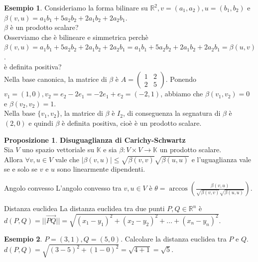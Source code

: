 \documentclass[a4paper]{article}
\theoremstyle{definition}
\newtheorem*{es}{Esempio}
\newtheorem*{prop}{Proposizione}
\begin{document}
	\begin{es}
		Consideriamo la forma bilinare su $\mathbb{R}^2, v = (a_1, a_2), u = (b_1, b_2)$ e $\beta(v, u) = a_1b_1 + 5a_2b_2 + 2a_1b_2 + 2a_2b_1$. \\
		$\beta$ è un prodotto scalare? \\
		Osserviamo che è bilineare e simmetrica perchè $\beta(v, u) = a_1b_1 + 5a_2b_2 + 2a_1b_2 + 2a_2b_1 = a_1b_1 + 5a_2b_2 + 2a_1b_2 + 2a_2b_1 = \beta(u, v)$. \\
		è definita positiva? \\
		Nella base canonica, la matrice di $\beta$ è $A = \begin{pmatrix}
			1 & 2 \\
			2 & 5
		\end{pmatrix}$. Ponendo $v_1 = (1, 0), v_2 = e_2 - 2e_1 = -2e_1 + e_2 = (-2, 1)$, abbiamo che $\beta(v_1, v_2) = 0$ e $\beta(v_2, v_2) = 1$. \\
		Nella base $\{v_1, v_2\}$, la matrice di $\beta$ è $I_2$, di conseguenza la segnatura di $\beta$ è $(2, 0)$ e quindi $\beta$ è definita positiva, cioè è un prodotto scalare.
	\end{es}

	\begin{prop}
		\textbf{Disuguaglianza di Carichy-Schwartz} \\
		Sia $V$ uno spazio vettoriale su $\mathbb{K}$ e sia $\beta: V \times V \to \mathbb{K}$ un prodotto scalare. \\
		Allora $\forall v, u \in V$ vale che $|\beta(v, u)| \le \sqrt{\beta(v, v)}\sqrt{\beta(u, u)}$ e l'uguaglianza vale se e solo se $v$ e $u$ sono linearmente dipendenti.
	\end{prop}
	\begin{deff}{Angolo convesso}{}
		L'angolo convesso tra $v, u \in V$ è $\theta = \arccos\left(\frac{\beta(v, u)}{\sqrt{\beta(v, v)}\sqrt{\beta(u, u)}}\right)$.
	\end{deff}
	\begin{deff}{Distanza euclidea}{}
		La distanza euclidea tra due punti $P, Q \in \mathbb{R}^n$ è $d(P, Q) = ||\overrightarrow{PQ}|| = \sqrt{(x_1 - y_1)^2 + (x_2 - y_2)^2 + ... + (x_n - y_n)^2}$.
	\end{deff}
	\begin{es}
		$P = (3, 1), Q = (5, 0)$. Calcolare la distanza euclidea tra $P$ e $Q$. \\
		$d(P, Q) = \sqrt{(3 - 5)^2 + (1 - 0)^2} = \sqrt{4 + 1} = \sqrt{5}$.
	\end{es}
\end{document}
